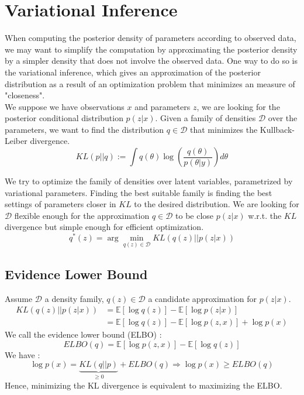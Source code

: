 \section{Variational Inference}
When computing the posterior density of parameters according to observed data, we may want to simplify the computation by approximating the posterior density by a simpler density that does not involve the observed data. One way to do so is the variational inference, which gives an approximation of the posterior distribution as a result of an optimization problem that minimizes an measure of "closeness".\\
We suppose we have observations $x$ and parameters $z$, we are looking for the posterior conditional distribution $p(z|x)$. Given a family of densities $\mathcal{D}$ over the parameters, we want to find the distribution $q \in \mathcal{D}$ that minimizes the Kullback-Leiber divergence. \\

\begin{equation}
KL(p||q) := \int q(\theta)\log\left(\frac{q(\theta)}{p(\theta|y)}\right) d\theta
\label{eq:KL_div}
\end{equation}

We try to optimize the family of densities over latent variables, parametrized by variational parameters. Finding the best suitable family is finding the best settings of parameters closer in $KL$ to the desired distribution. We are looking for $\mathcal{D}$ flexible enough for the approximation $q \in \mathcal{D}$ to be close $p(z|x)$ w.r.t. the $KL$ divergence but simple enough for efficient optimization.\\

\begin{equation}
q^*(z) = \arg\min_{q(z) \in \mathcal{D}} KL(q(z)||p(z|x))
\label{eq:best_q}
\end{equation}

\subsection{Evidence Lower Bound}

Assume $\mathcal{D}$ a density family, $q(z) \in \mathcal{D}$ a candidate approximation for $p(z|x)$.
\begin{align}
KL(q(z)||p(z|x)) &= \mathbb{E}\left[\log q(z)\right] - \mathbb{E}\left[\log p(z|x)\right]\\
&= \mathbb{E}\left[\log q(z)\right] - \mathbb{E}\left[\log p(z,x)\right] + \log p(x)
\label{eq:KL_to_logP}
\end{align} 
We call the evidence lower bound (ELBO) :
\begin{equation}
ELBO(q) = \mathbb{E}\left[\log p(z,x)\right] - \mathbb{E}\left[\log q(z)\right]
\label{eq:ELBO}
\end{equation}
We have :
\begin{equation}
\log p(x) = \underbrace{KL(q||p)}_{\geq 0} + ELBO(q) \Rightarrow \log p(x) \geq ELBO(q)
\label{eq:ELBO+KL}
\end{equation}
Hence, minimizing the KL divergence is equivalent to maximizing the ELBO.\\

